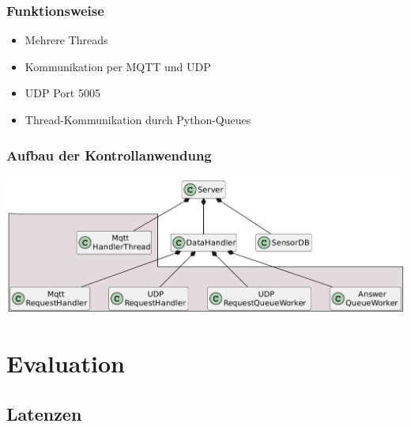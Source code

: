 \documentclass{beamer}
\begin{document}
\begin{frame}
\frametitle[]{Funktionsweise}
\begin{itemize}
    \item Mehrere Threads
    \item Kommunikation per MQTT und UDP
    \item UDP Port 5005
    \item Thread-Kommunikation durch Python-Queues
\end{itemize}
\end{frame}

\begin{frame}
\frametitle[]{Aufbau der Kontrollanwendung}
\includegraphics[width=\textwidth]{images/ServerUml.pdf}
\end{frame}


\section{Evaluation}
\subsection{Latenzen}
\end{document}
